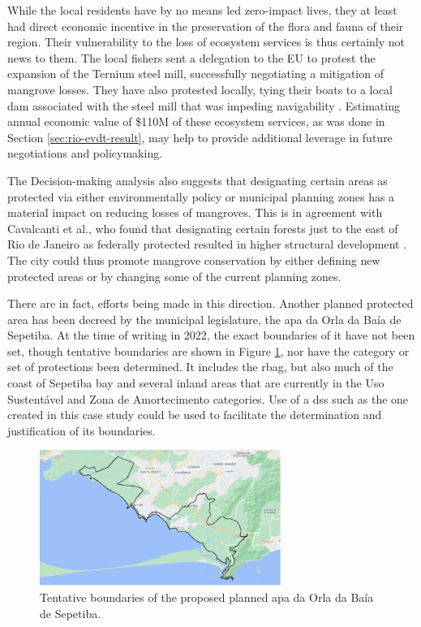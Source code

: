 While the local residents have by no means led zero-impact lives, they at least had direct economic incentive in the preservation of the flora and fauna of their region. Their vulnerability to the loss of ecosystem services is thus certainly not news to them. The local fishers sent a delegation to the EU to protest the expansion of the Ternium steel mill, successfully negotiating a mitigation of mangrove losses. They have also protested locally, tying their boats to a local dam associated with the steel mill that was impeding navigability \cite{institutopacsSemPeixeSem2021}. Estimating annual economic value of \$110M of these ecosystem services, as was done in Section \ref{sec:rio-evdt-result}, may help to provide additional leverage in future negotiations and policymaking.

The Decision-making analysis also suggests that designating certain areas as protected via either environmentally policy or municipal planning zones has a material impact on reducing losses of mangroves. This is in agreement with Cavalcanti et al., who found that designating certain forests just to the east of Rio de Janeiro as federally protected resulted in higher structural development \cite{cavalcantiEvaluatingMangroveConservation2009}. The city could thus promote mangrove conservation by either defining new protected areas or by changing some of the current planning zones.

There are in fact, efforts being made in this direction. Another planned protected area has been decreed by the municipal legislature, the \ac{apa} da Orla da Baía de Sepetiba. At the time of writing in 2022, the exact boundaries of it have not been set, though tentative boundaries are shown in Figure \ref{fig:apa_sepetiba}, nor have the category or set of protections been determined. It includes the \ac{rbag}, but also much of the coast of Sepetiba bay and several inland areas that are currently in the Uso Sustentável and Zona de Amortecimento categories. Use of a \ac{dss} such as the one created in this case study could be used to facilitate the determination and justification of its boundaries.

\begin{figure}[!htb] 
\centering
\includegraphics[width=0.7\textwidth]{Figures/chap4/apa_sepetiba.png}
\caption[APA da Orla da Baía de Sepetiba]{Tentative boundaries of the proposed planned \ac{apa} da Orla da Baía de Sepetiba.}
\label{fig:apa_sepetiba}
\end{figure}

